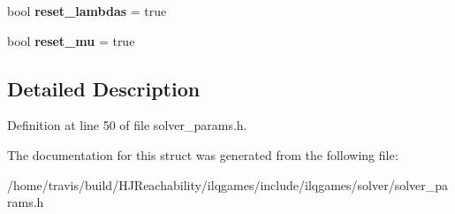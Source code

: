 \begin{DoxyCompactItemize}
\item 
bool {\bfseries reset\+\_\+lambdas} = true\hypertarget{structilqgames_1_1_solver_params_ac7d300d71209797652560c1fec7312ab}{}\label{structilqgames_1_1_solver_params_ac7d300d71209797652560c1fec7312ab}

\item 
bool {\bfseries reset\+\_\+mu} = true\hypertarget{structilqgames_1_1_solver_params_a61abf2d230c85e55db5dbbc40ac53b90}{}\label{structilqgames_1_1_solver_params_a61abf2d230c85e55db5dbbc40ac53b90}

\end{DoxyCompactItemize}


\subsection{Detailed Description}


Definition at line 50 of file solver\+\_\+params.\+h.



The documentation for this struct was generated from the following file\+:\begin{DoxyCompactItemize}
\item 
/home/travis/build/\+H\+J\+Reachability/ilqgames/include/ilqgames/solver/solver\+\_\+params.\+h\end{DoxyCompactItemize}

